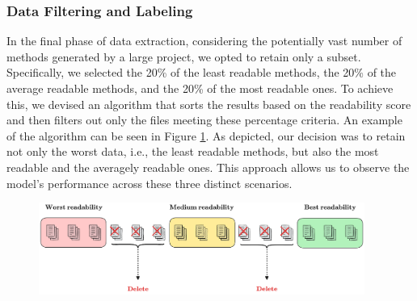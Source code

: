 \subsubsection{Data Filtering and Labeling} %
\label{sub:Labeling}
In the final phase of data extraction, considering the potentially vast number of methods generated by a large project, we opted to retain only a subset. Specifically, we selected the 20\% of the least readable methods, the 20\% of the average readable methods, and the 20\% of the most readable ones. To achieve this, we devised an algorithm that sorts the results based on the readability score and then filters out only the files meeting these percentage criteria. An example of the algorithm can be seen in Figure \ref{fig:filter_algorithm}.
As depicted, our decision was to retain not only the worst data, i.e., the least readable methods, but also the most readable and the averagely readable ones. This approach allows us to observe the model's performance across these three distinct scenarios.
\vspace{0.5cm}
\begin{figure}[H]
	\begin{center}
		\includegraphics[width=0.95\textwidth]{figs/filter_algorithm.png}
	\end{center}
	\caption{}\label{fig:filter_algorithm}
\end{figure}


